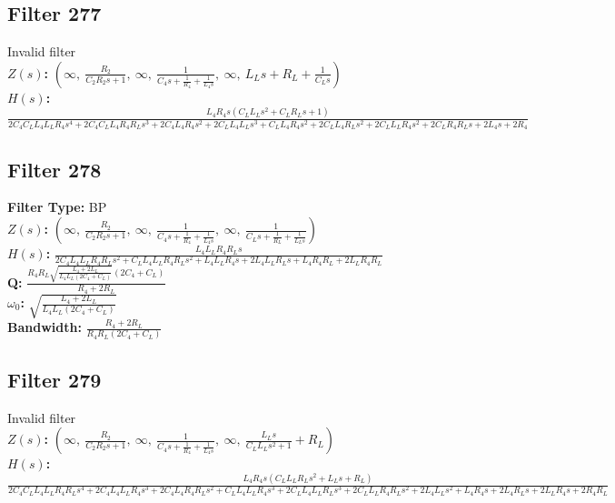 \documentclass{article}
\begin{document}
\subsection*{Filter 277}
Invalid filter \\ 
\textbf{$Z(s)$:} $\left( \infty, \  \frac{R_{2}}{C_{2} R_{2} s + 1}, \  \infty, \  \frac{1}{C_{4} s + \frac{1}{R_{4}} + \frac{1}{L_{4} s}}, \  \infty, \  L_{L} s + R_{L} + \frac{1}{C_{L} s}\right)$ \\ 
\textbf{$H(s)$:} $\frac{L_{4} R_{4} s \left(C_{L} L_{L} s^{2} + C_{L} R_{L} s + 1\right)}{2 C_{4} C_{L} L_{4} L_{L} R_{4} s^{4} + 2 C_{4} C_{L} L_{4} R_{4} R_{L} s^{3} + 2 C_{4} L_{4} R_{4} s^{2} + 2 C_{L} L_{4} L_{L} s^{3} + C_{L} L_{4} R_{4} s^{2} + 2 C_{L} L_{4} R_{L} s^{2} + 2 C_{L} L_{L} R_{4} s^{2} + 2 C_{L} R_{4} R_{L} s + 2 L_{4} s + 2 R_{4}}$ \\ 
\subsection*{Filter 278}
\textbf{Filter Type:} BP \\ 
\textbf{$Z(s)$:} $\left( \infty, \  \frac{R_{2}}{C_{2} R_{2} s + 1}, \  \infty, \  \frac{1}{C_{4} s + \frac{1}{R_{4}} + \frac{1}{L_{4} s}}, \  \infty, \  \frac{1}{C_{L} s + \frac{1}{R_{L}} + \frac{1}{L_{L} s}}\right)$ \\ 
\textbf{$H(s)$:} $\frac{L_{4} L_{L} R_{4} R_{L} s}{2 C_{4} L_{4} L_{L} R_{4} R_{L} s^{2} + C_{L} L_{4} L_{L} R_{4} R_{L} s^{2} + L_{4} L_{L} R_{4} s + 2 L_{4} L_{L} R_{L} s + L_{4} R_{4} R_{L} + 2 L_{L} R_{4} R_{L}}$ \\ 
\textbf{Q:} $\frac{R_{4} R_{L} \sqrt{\frac{L_{4} + 2 L_{L}}{L_{4} L_{L} \left(2 C_{4} + C_{L}\right)}} \left(2 C_{4} + C_{L}\right)}{R_{4} + 2 R_{L}}$ \\ 
\textbf{$\omega_0$:} $\sqrt{\frac{L_{4} + 2 L_{L}}{L_{4} L_{L} \left(2 C_{4} + C_{L}\right)}}$ \\ 
\textbf{Bandwidth:} $\frac{R_{4} + 2 R_{L}}{R_{4} R_{L} \left(2 C_{4} + C_{L}\right)}$ \\ 
\subsection*{Filter 279}
Invalid filter \\ 
\textbf{$Z(s)$:} $\left( \infty, \  \frac{R_{2}}{C_{2} R_{2} s + 1}, \  \infty, \  \frac{1}{C_{4} s + \frac{1}{R_{4}} + \frac{1}{L_{4} s}}, \  \infty, \  \frac{L_{L} s}{C_{L} L_{L} s^{2} + 1} + R_{L}\right)$ \\ 
\textbf{$H(s)$:} $\frac{L_{4} R_{4} s \left(C_{L} L_{L} R_{L} s^{2} + L_{L} s + R_{L}\right)}{2 C_{4} C_{L} L_{4} L_{L} R_{4} R_{L} s^{4} + 2 C_{4} L_{4} L_{L} R_{4} s^{3} + 2 C_{4} L_{4} R_{4} R_{L} s^{2} + C_{L} L_{4} L_{L} R_{4} s^{3} + 2 C_{L} L_{4} L_{L} R_{L} s^{3} + 2 C_{L} L_{L} R_{4} R_{L} s^{2} + 2 L_{4} L_{L} s^{2} + L_{4} R_{4} s + 2 L_{4} R_{L} s + 2 L_{L} R_{4} s + 2 R_{4} R_{L}}$ \\ 
\end{document}
